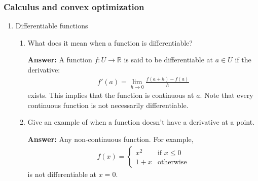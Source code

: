 \documentclass{article}
\newenvironment{QandA}{\begin{enumerate}[label=\arabic*.]}{\end{enumerate}}
\newenvironment{InnerQandA}{\begin{enumerate}[label=\roman*.]}{\end{enumerate}}
\newenvironment{answer}{\par\normalfont \textbf{Answer:}}{}
\newcommand{\R}{\mathbb{R}}
\begin{document}
\subsubsection{Calculus and convex optimization}
\begin{QandA}
    \item Differentiable functions
    \begin{InnerQandA}
        \item What does it mean when a function is differentiable?
        \begin{answer}
            A function $f: U \rightarrow \R$ is said to be differentiable at $a \in U$ if the derivative:
            \begin{align*}
                f'(a) = \lim_{h \rightarrow 0} \frac{f(a+h) - f(a)}{h}
            \end{align*}
            exists. This implies that the function is continuous at $a$. Note that every continuous function is not necessarily differentiable.
        \end{answer}

        \item Give an example of when a function doesn’t have a derivative at a point.  
        \begin{answer}
            Any non-continuous function. For example,
            \begin{align*}
                f(x) =
                    \begin{cases}
                    x^2 & \text{if } x \le 0\\
                    1+x & \text{otherwise}
                    \end{cases}
            \end{align*}
            is not differentiable at $x=0$.
        \end{answer}


\end{InnerQandA}
\end{QandA}
\end{document}
